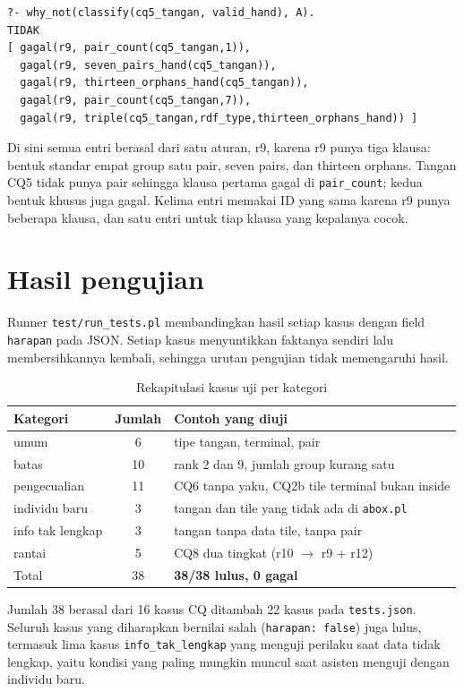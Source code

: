 \documentclass[11pt,a4paper]{article}
\newcommand{\code}[1]{\texttt{#1}}
\begin{document}
\begin{lstlisting}
?- why_not(classify(cq5_tangan, valid_hand), A).
TIDAK
[ gagal(r9, pair_count(cq5_tangan,1)),
  gagal(r9, seven_pairs_hand(cq5_tangan)),
  gagal(r9, thirteen_orphans_hand(cq5_tangan)),
  gagal(r9, pair_count(cq5_tangan,7)),
  gagal(r9, triple(cq5_tangan,rdf_type,thirteen_orphans_hand)) ]
\end{lstlisting}

Di sini semua entri berasal dari satu aturan, r9, karena r9 punya tiga klausa: bentuk
standar empat group satu pair, seven pairs, dan thirteen orphans. Tangan CQ5 tidak punya
pair sehingga klausa pertama gagal di \code{pair\_count}; kedua bentuk khusus juga gagal.
Kelima entri memakai ID yang sama karena r9 punya beberapa klausa, dan satu
entri untuk tiap klausa yang kepalanya cocok.

\section{Hasil pengujian}

Runner \code{test/run_tests.pl} membandingkan hasil setiap kasus dengan field
\code{harapan} pada JSON. Setiap kasus menyuntikkan faktanya sendiri lalu membersihkannya
kembali, sehingga urutan pengujian tidak memengaruhi hasil.

\begin{table}[h]
\centering\small
\caption{Rekapitulasi kasus uji per kategori}
\label{tab:uji}
\begin{tabular}{@{}lcl@{}}
\toprule
Kategori & Jumlah & Contoh yang diuji \\
\midrule
umum & 6 & tipe tangan, terminal, pair \\
batas & 10 & rank 2 dan 9, jumlah group kurang satu \\
pengecualian & 11 & CQ6 tanpa yaku, CQ2b tile terminal bukan inside \\
individu baru & 3 & tangan dan tile yang tidak ada di \code{abox.pl} \\
info tak lengkap & 3 & tangan tanpa data tile, tanpa pair \\
rantai & 5 & CQ8 dua tingkat (r10 $\to$ r9 + r12) \\
\midrule
Total & 38 & \textbf{38/38 lulus, 0 gagal} \\
\bottomrule
\end{tabular}
\end{table}

Jumlah 38 berasal dari 16 kasus CQ ditambah 22 kasus pada \code{tests.json}. Seluruh kasus
yang diharapkan bernilai salah (\code{harapan: false}) juga lulus, termasuk lima kasus
\code{info_tak_lengkap} yang menguji perilaku saat data tidak lengkap, yaitu kondisi yang
paling mungkin muncul saat asisten menguji dengan individu baru.
\end{document}
